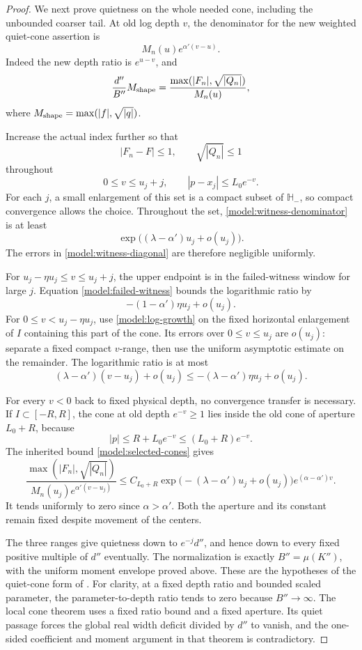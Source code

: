 \begin{proof}
We next prove quietness on the whole needed cone,
including the unbounded coarser tail.  At old log
depth \(v\), the denominator for the new weighted
quiet-cone assertion is
\begin{equation}
\label{model:witness-denominator}
 M_n(u)e^{\alpha'(v-u)}.
\end{equation}
Indeed the new depth ratio is \(e^{u-v}\), and
\[
 \frac{d''}{B''}M_{\rm shape}
 =
 \frac{\max(|F_n|,\sqrt{|Q_n|})}{M_n(u)},
\]
where \(M_{\rm shape}=\max(|f|,\sqrt{|q|})\).

Increase the actual index further so that
\begin{equation}
\label{model:witness-diagonal}
 |F_n-F|\le1,\qquad \sqrt{|Q_n|}\le1
\end{equation}
throughout
\[
 0\le v\le u_j+j,\qquad |p-x_j|\le L_0e^{-v}.
\]
For each \(j\), a small enlargement of this set is a
compact subset of \(\mathbb H_-\), so compact convergence
allows the choice.  Throughout the set,
\eqref{model:witness-denominator} is at least
\[
 \exp\bigl((\lambda-\alpha')u_j+o(u_j)\bigr).
\]
The errors in \eqref{model:witness-diagonal} are
therefore negligible uniformly.

For \(u_j-\eta u_j\le v\le u_j+j\), the upper endpoint
is in the failed-witness window for large \(j\).
Equation \eqref{model:failed-witness} bounds the
logarithmic ratio by
\[
 -(1-\alpha')\eta u_j+o(u_j).
\]
For \(0\le v<u_j-\eta u_j\), use
\eqref{model:log-growth} on the fixed horizontal
enlargement of \(I\) containing this part of the cone.
Its errors over \(0\le v\le u_j\) are \(o(u_j)\):
separate a fixed compact \(v\)-range, then use the
uniform asymptotic estimate on the remainder.
The logarithmic ratio is at most
\[
 (\lambda-\alpha')(v-u_j)+o(u_j)
 \le-(\lambda-\alpha')\eta u_j+o(u_j).
\]

For every \(v<0\) back to fixed physical depth,
no convergence transfer is necessary.
If \(I\subset[-R,R]\), the cone at old depth
\(e^{-v}\ge1\) lies inside the old cone of aperture
\(L_0+R\), because
\[
 |p|\le R+L_0e^{-v}\le(L_0+R)e^{-v}.
\]
The inherited bound \eqref{model:selected-cones} gives
\[
 \frac{\max(|F_n|,\sqrt{|Q_n|})}
      {M_n(u_j)e^{\alpha'(v-u_j)}}
 \le
 C_{L_0+R}
 \exp\bigl(-(\lambda-\alpha')u_j+o(u_j)\bigr)
 e^{(\alpha-\alpha')v}.
\]
It tends uniformly to zero since \(\alpha>\alpha'\).
Both the aperture and its constant remain fixed
despite movement of the centers.

The three ranges give quietness down to \(e^{-j}d''\),
and hence down to every fixed positive multiple of
\(d''\) eventually.  The normalization is exactly
\(B''=\mu(K'')\), with the uniform moment envelope
proved above.  These are the hypotheses of the
quiet-cone form of .
For clarity, at a fixed depth ratio and bounded
scaled parameter, the parameter-to-depth ratio
tends to zero because \(B''\to\infty\).
The local cone theorem uses a fixed ratio bound and
a fixed aperture.  Its quiet passage forces the
global real width deficit divided by \(d''\) to
vanish, and the one-sided coefficient and moment
argument in that theorem is contradictory.


\end{proof}
